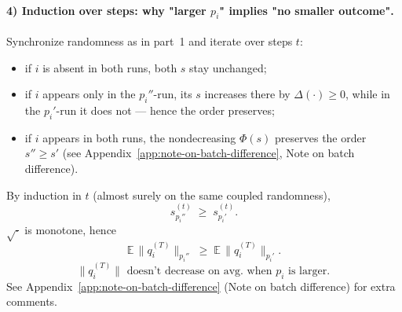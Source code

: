 \paragraph{4) Induction over steps: why "larger $p_i$" implies "no smaller outcome".}
Synchronize randomness as in part~1 and iterate over steps $t$:
\begin{itemize}
  \item if $i$ is absent in both runs, both $s$ stay unchanged;
  \item if $i$ appears only in the $p_i''$-run, its $s$ increases there by $\Delta(\cdot) \ge 0$, while in the $p_i'$-run it does not — hence the order preserves;
  \item if $i$ appears in both runs, the nondecreasing $\Phi(s)$ preserves the order $s'' \ge s'$ (see Appendix~\ref{app:note-on-batch-difference}, Note on batch difference).
\end{itemize}
By induction in $t$ (almost surely on the same coupled randomness),
\begin{equation}
s^{(t)}_{p_i''} \;\ge\; s^{(t)}_{p_i'}.
\end{equation}
$\sqrt{\cdot}$ is monotone, hence
\begin{equation}
\mathbb E\,\bigl\|q_i^{(T)}\bigr\|_{p_i''} \;\ge\; \mathbb E\,\bigl\|q_i^{(T)}\bigr\|_{p_i'}.
\end{equation}
\begin{equation}
\boxed{\bigl\|q_i^{(T)}\bigr\| \text{ doesn't decrease on avg. when } p_i \text{ is larger.} \, }
\end{equation}
See Appendix~\ref{app:note-on-batch-difference} (Note on batch difference) for extra comments.
